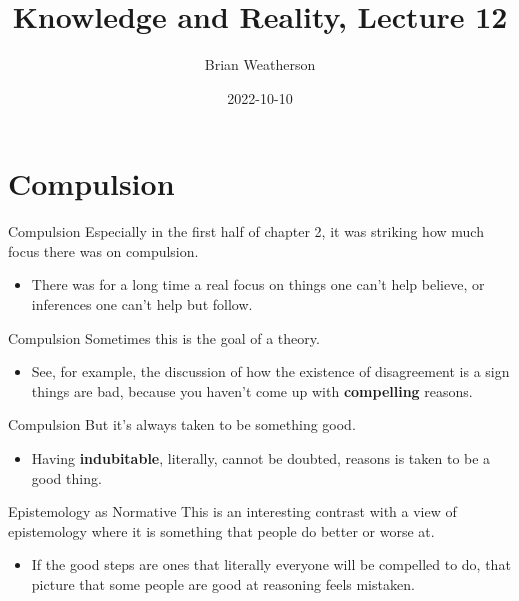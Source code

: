 \documentclass[
  17pt,
  letterpaper,
  ignorenonframetext,
  aspectratio=169,
  handout]{beamer}
\title{Knowledge and Reality, Lecture 12}
\author{Brian Weatherson}
\date{2022-10-10}
\providecommand{\tightlist}{%
  \setlength{\itemsep}{0pt}\setlength{\parskip}{0pt}}\usepackage{longtable,booktabs,array}
\begin{document}
\frame{\titlepage}
\ifdefined\Shaded\renewenvironment{Shaded}{\begin{tcolorbox}[interior hidden, sharp corners, borderline west={3pt}{0pt}{shadecolor}, frame hidden, breakable, enhanced, boxrule=0pt]}{\end{tcolorbox}}\fi

\hypertarget{compulsion}{%
\section{Compulsion}\label{compulsion}}

\begin{frame}{Compulsion}
\protect\hypertarget{compulsion-1}{}
Especially in the first half of chapter 2, it was striking how much
focus there was on compulsion.

\begin{itemize}[<+->]
\tightlist
\item
  There was for a long time a real focus on things one can't help
  believe, or inferences one can't help but follow.
\end{itemize}
\end{frame}

\begin{frame}{Compulsion}
\protect\hypertarget{compulsion-2}{}
Sometimes this is the goal of a theory.

\begin{itemize}[<+->]
\tightlist
\item
  See, for example, the discussion of how the existence of disagreement
  is a sign things are bad, because you haven't come up with
  \textbf{compelling} reasons.
\end{itemize}
\end{frame}

\begin{frame}{Compulsion}
\protect\hypertarget{compulsion-3}{}
But it's always taken to be something good.

\begin{itemize}[<+->]
\tightlist
\item
  Having \textbf{indubitable}, literally, cannot be doubted, reasons is
  taken to be a good thing.
\end{itemize}
\end{frame}

\begin{frame}{Epistemology as Normative}
\protect\hypertarget{epistemology-as-normative}{}
This is an interesting contrast with a view of epistemology where it is
something that people do better or worse at.

\begin{itemize}[<+->]
\tightlist
\item
  If the good steps are ones that literally everyone will be compelled
  to do, that picture that some people are good at reasoning feels
  mistaken.
\end{itemize}
\end{frame}
\end{document}
